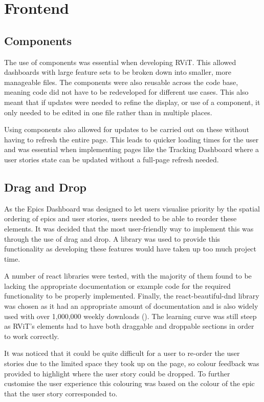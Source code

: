 \documentclass[l4proj.tex]{subfiles}
\begin{document}
\section{Frontend}

\subsection{Components}
The use of components was essential when developing RViT. This allowed dashboards with large feature sets to be broken down into smaller, more manageable files. The components were also reusable across the code base, meaning code did not have to be redeveloped for different use cases. This also meant that if updates were needed to refine the display, or use of a component, it only needed to be edited in one file rather than in multiple places. 

Using components also allowed for updates to be carried out on these without having to refresh the entire page. This leads to quicker loading times for the user and was essential when implementing pages like the Tracking Dashboard where a user stories state can be updated without a full-page refresh needed. 

\subsection{Drag and Drop}
As the Epics Dashboard was designed to let users visualise priority by the spatial ordering of epics and user stories, users needed to be able to reorder these elements. It was decided that the most user-friendly way to implement this was through the use of drag and drop. A library was used to provide this functionality as developing these features would have taken up too much project time. 

A number of react libraries were tested, with the majority of them found to be lacking the appropriate documentation or example code for the required functionality to be properly implemented. Finally, the react-beautiful-dnd library was chosen as it had an appropriate amount of documentation and is also widely used with over 1,000,000 weekly downloads (\cite{ReactDnD}). The learning curve was still steep as RViT's elements had to have both draggable and droppable sections in order to work correctly. 

It was noticed that it could be quite difficult for a user to re-order the user stories due to the limited space they took up on the page, so colour feedback was provided to highlight where the user story could be dropped. To further customise the user experience this colouring was based on the colour of the epic that the user story corresponded to. 
\end{document}
